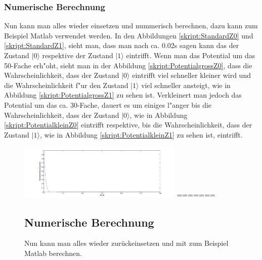 \begin{refsection}
\subsubsection{Numerische Berechnung}
Nun kann man alles wieder einsetzen und nummerisch berechnen, dazu kann
zum Beispiel Matlab verwendet werden.
In den Abbildungen \ref{skript:StandardZ0} und \ref{skript:StandardZ1},
sieht man, dass man nach ca. 0.02s sagen kann das der Zustand
$|0\rangle$ respektive der Zustand $|1\rangle$ eintrifft. Wenn man
das Potential um das 50-Fache erh"oht, sieht man in der Abbildung
\ref{skript:PotentialgrossZ0}, dass die Wahrscheinlichkeit, dass
der Zustand $|0\rangle$ eintrifft viel schneller kleiner wird und die
Wahrscheinlichkeit f"ur den Zustand $|1\rangle$ viel schneller ansteigt,
wie in Abbildung \ref{skript:PotentialgrossZ1} zu sehen ist. Verkleinert
man jedoch das Potential um das ca. 30-Fache, dauert es um einiges
l"anger bis die Wahrscheinlichkeit, dass der Zustand $|0\rangle$, wie
in Abbildung \ref{skript:PotentialkleinZ0} eintrifft respektive, bis
die Wahrscheinlichkeit, dass der Zustand $|1\rangle$, wie in Abbildung
\ref{skript:PotentialkleinZ1} zu sehen ist, eintrifft.

\begin{figure}
\centering
\includegraphics[width=0.7\textwidth]{flash/graphics/StandardZ0.pdf}
=======
\subsection{Numerische Berechnung}
Nun kann man alles wieder zurückeinsetzen und mit zum Beispiel Matlab berechnen.



\end{figure}
\end{refsection}
